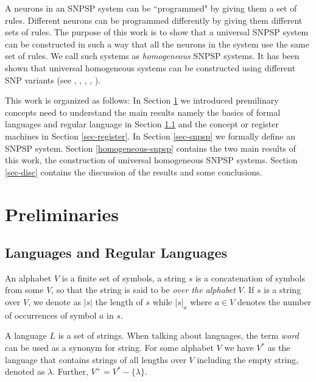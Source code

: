 \documentclass[runningheads,a4paper]{llncs}
\begin{document}
A neurons in an SNPSP system can be ``programmed" by giving them a set of rules. Different neurons can be programmed differently by giving them 
different sets of rules. The purpose of this work is to show that a universal SNPSP system can be constructed in such a way that all the neurons in
the system use the same set of rules. We call such systems as \textit{homogeneous} SNPSP systems. It has been shown that universal homogeneous systems
can be constructed using different SNP variants (see \cite{HSNP}, \cite{HISNP}, \cite{HSNP-R}, \cite{HSNP-S}, \cite{HSNP-A}).

This work is organized as follows: In Section \ref{sec-prelims} we introduced premilinary concepts need to understand the main results namely the
basics of formal languages and regular language in Section \ref{sec-lang-reg} and the concept or register machines in Section \ref{sec-register}. In
Section \ref{sec-snpsp} we formally define an SNPSP system. Section \ref{homogeneous-snpsp} contains the two main results of this work, the 
construction of universal homogeneous SNPSP systems. Section \ref{sec-disc} contains the discussion of the results and some conclusions.




\section{Preliminaries} \label{sec-prelims}


\subsection{Languages and Regular Languages} \label{sec-lang-reg}

An alphabet $V$ is a finite set of symbols, a string $s$ is a concatenation of symbols from some $V$, so that the string is said to be \textit{over
the alphabet} $V$. If $s$ is a string over $V$, we denote as $|s|$ the length of $s$ while $|s|_a$ where $a \in V$ denotes the number of occurrences 
of symbol $a$ in $s$. 
  
A language $L$ is a set of strings. When talking about languages, the term \textit{word} can be
used as a synonym for string. For some alphabet $V$ we have $V^*$ as the language that contains
strings of all lengths over $V$ including the empty string, denoted as $\lambda$. Further, 
$V^+ = V^* - \{\lambda\}$. 
\end{document}
